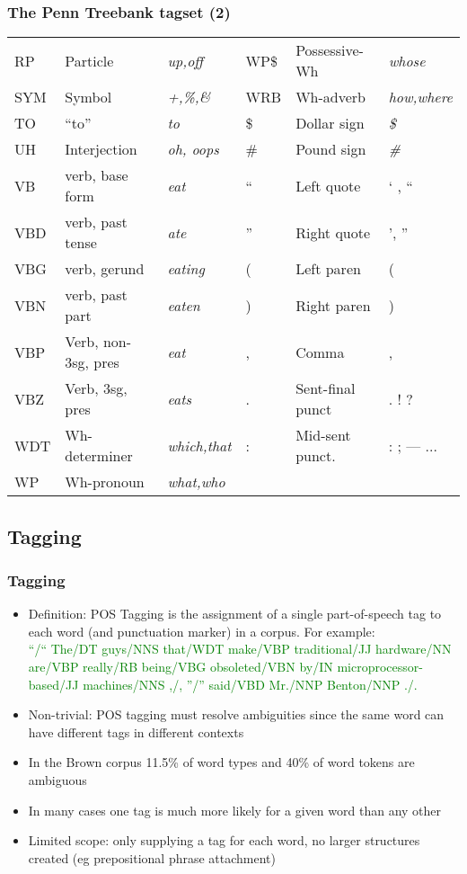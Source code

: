 \documentclass{beamer}             %
\begin{document}
\begin{frame}
  \frametitle{The Penn Treebank tagset (2)}
  \textcolor{black}{\footnotesize
    \begin{tabular}{|lll|lll|}
      \hline
      RP & Particle & \emph{up,off} &
      WP\$ & Possessive-Wh & \emph{whose} \\ 
      SYM & Symbol & \emph{+,\%,\&}  &
      WRB & Wh-adverb & \emph{how,where} \\
      TO & ``to'' & \emph{to} &
      \$ & Dollar sign & \emph{\$}\\
      UH & Interjection & \emph{oh, oops} &
      \# & Pound sign & \emph{\#} \\
      VB & verb, base form &     \emph{eat} &
      `` & Left quote & ` , `` \\
      VBD & verb, past tense & \emph{ate} &
      '' & Right quote & ', '' \\
      VBG & verb, gerund & \emph{eating} &
      ( & Left paren & ( \\
      VBN & verb, past part & \emph{eaten} &
      ) & Right paren & ) \\
      VBP & Verb, non-3sg, pres & \emph{eat} &
      , & Comma & , \\
      VBZ & Verb, 3sg, pres & \emph{eats} &
      . & Sent-final punct & . ! ? \\
      WDT & Wh-determiner &  \emph{which,that} &
      : & Mid-sent punct. & : ; --- ... \\
      WP & Wh-pronoun & \emph{what,who} & & & \\
      \hline
    \end{tabular}
  }
\end{frame}

\subsection{Tagging}

\begin{frame}
  \frametitle{Tagging}
  \begin{itemize}
  \item Definition: POS Tagging is the assignment of a single
    part-of-speech tag to each word (and punctuation marker) in a
    corpus.  For example:\\
    {\scriptsize
    \textcolor{green}{``/``  The/DT  guys/NNS  that/WDT  make/VBP
      traditional/JJ  hardware/NN  are/VBP  really/RB  being/VBG
      obsoleted/VBN  by/IN  microprocessor-based/JJ  machines/NNS  ,/,
      ''/''  said/VBD  Mr./NNP  Benton/NNP  ./.}}
  \item Non-trivial: POS tagging must resolve ambiguities since the
    same word can have different tags in different contexts
  \item In the Brown corpus 11.5\% of word types and 40\% of word
    tokens are ambiguous
  \item In many cases one tag is much more likely for a given word
    than any other
  \item Limited scope: only supplying a tag for each word, no larger
    structures created (eg prepositional phrase attachment)
  \end{itemize}  
\end{frame}
\end{document}
